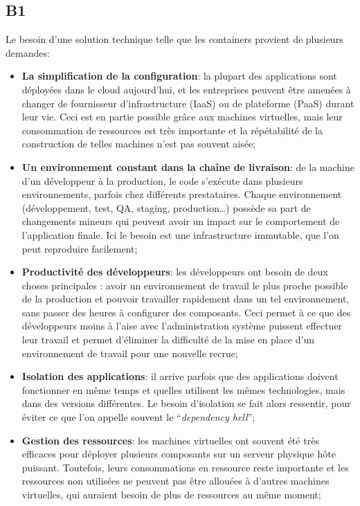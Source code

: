 \subsection*{B1}
    Le besoin d'une solution technique telle que les containers provient de plusieurs demandes:
    \begin{itemize}
        \item \textbf{La simplification de la configuration}: la plupart des applications sont déployées dans le cloud aujourd'hui, et les entreprises peuvent être amenées à changer de fournisseur d'infrastructure (IaaS) ou de plateforme (PaaS) durant leur vie. Ceci est en partie possible grâce aux machines virtuelles, mais leur consommation de ressources est très importante et la répétabilité de la construction de telles machines n'est pas souvent aisée;
        \item \textbf{Un environnement constant dans la chaîne de livraison}: de la machine d'un développeur à la production, le code s'exécute dans plusieurs environnements, parfois chez différents prestataires. Chaque environnement (développement, test, QA, staging, production\dots) possède sa part de changements mineurs qui peuvent avoir un impact sur le comportement de l'application finale. Ici le besoin est une infrastructure immutable, que l'on peut reproduire facilement;
        \item \textbf{Productivité des développeurs}: les développeurs ont besoin de deux choses principales : avoir un environnement de travail le plus proche possible de la production et pouvoir travailler rapidement dans un tel environnement, sans passer des heures à configurer des composants. Ceci permet à ce que des développeurs moins à l'aise avec l'administration système puissent effectuer leur travail et permet d'éliminer la difficulté de la mise en place d'un environnement de travail pour une nouvelle recrue;
        \item \textbf{Isolation des applications}: il arrive parfois que des applications doivent fonctionner en même temps et quelles utilisent les mêmes technologies, mais dans des versions différentes. Le besoin d'isolation se fait alors ressentir, pour éviter ce que l'on appelle souvent le \enquote{\textit{dependency hell}};
        \item \textbf{Gestion des ressources}: les machines virtuelles ont souvent été très efficaces pour déployer plusieurs composants sur un serveur physique hôte puissant. Toutefois, leurs consommations en ressource reste importante et les ressources non utilisées ne peuvent pas être allouées à d'autres machines virtuelles, qui auraient besoin de plus de ressources au même moment;

\end{itemize}
